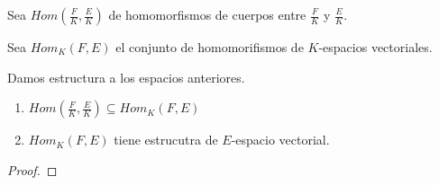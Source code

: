 Sea $Hom(\frac{F}{K},\frac{E}{K})$ de homomorfismos de cuerpos entre $\frac{F}{K}$ y $\frac{E}{K}$. 

Sea $Hom_K(F,E)$ el conjunto de homomorifismos de $K$-espacios vectoriales.

\begin{proposition}
Damos estructura a los espacios anteriores. 
\begin{enumerate}
\item $Hom(\frac{F}{K},\frac{E}{K}) \subseteq Hom_K(F,E)$
\item $Hom_K(F,E)$ tiene estrucutra de $E$-espacio vectorial.
\end{enumerate}
\end{proposition}
\begin{proof}

\end{proof}
